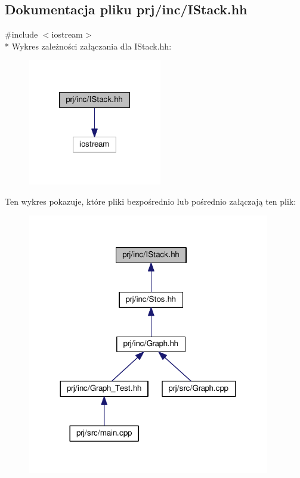 \hypertarget{_i_stack_8hh}{\subsection{Dokumentacja pliku prj/inc/\-I\-Stack.hh}
\label{_i_stack_8hh}
}
{\ttfamily \#include $<$iostream$>$}\\*
Wykres zależności załączania dla I\-Stack.\-hh\-:
\nopagebreak
\begin{figure}[H]
\begin{center}
\leavevmode
\includegraphics[width=166pt]{_i_stack_8hh__incl}
\end{center}
\end{figure}
Ten wykres pokazuje, które pliki bezpośrednio lub pośrednio załączają ten plik\-:
\nopagebreak
\begin{figure}[H]
\begin{center}
\leavevmode
\includegraphics[width=300pt]{_i_stack_8hh__dep__incl}
\end{center}
\end{figure}
